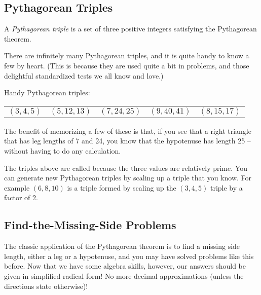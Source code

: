 \subsection{Pythagorean Triples}

\begin{boxeddef}
A \textit{Pythagorean triple} is a set of three positive integers satisfying the Pythagorean theorem.
\end{boxeddef}

There are infinitely many Pythagorean triples, and it is quite handy to know a few by heart. (This is because they are used quite a bit in problems, and those delightful standardized tests we all know and love.)

Handy Pythagorean triples:

\begin{tabular}{*{5}{C{0.15\textwidth}}}
$(3, 4, 5)$ &
$(5, 12, 13)$ &
$(7, 24, 25)$ &
$(9, 40, 41)$ &
$(8, 15, 17)$
\end{tabular}

The benefit of memorizing a few of these is that, if you see that a right triangle that has leg lengths of 7 and 24, you know that the hypotenuse has length 25 -- without having to do any calculation.

The triples above are called  because the three values are relatively prime. You can generate new Pythagorean triples by scaling up a triple that you know. For example $(6, 8, 10)$ is a triple formed by scaling up the $(3, 4, 5)$ triple by a factor of 2.

\subsection{Find-the-Missing-Side Problems}

The classic application of the Pythagorean theorem is to find a missing side length, either a leg or a hypotenuse, and you may have solved problems like this before. Now that we have some algebra skills, however, our answers should be given in simplified radical form! No more decimal approximations (unless the directions state otherwise)!

